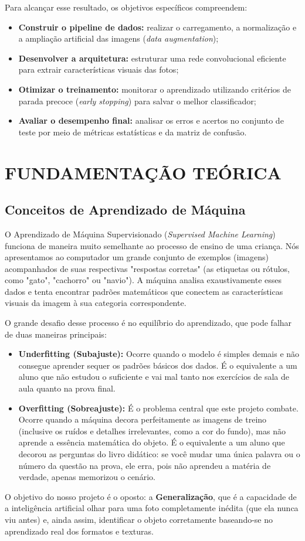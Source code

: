 \documentclass[12pt,a4paper]{article}
\begin{document}
Para alcançar esse resultado, os objetivos específicos compreendem:
\begin{itemize}
    \item \textbf{Construir o pipeline de dados:} realizar o carregamento, a normalização e a ampliação artificial das imagens (\textit{data augmentation});
    \item \textbf{Desenvolver a arquitetura:} estruturar uma rede convolucional eficiente para extrair características visuais das fotos;
    \item \textbf{Otimizar o treinamento:} monitorar o aprendizado utilizando critérios de parada precoce (\textit{early stopping}) para salvar o melhor classificador;
    \item \textbf{Avaliar o desempenho final:} analisar os erros e acertos no conjunto de teste por meio de métricas estatísticas e da matriz de confusão.
\end{itemize}

\newpage
\section{FUNDAMENTAÇÃO TEÓRICA}
\subsection{Conceitos de Aprendizado de Máquina}
O Aprendizado de Máquina Supervisionado (\textit{Supervised Machine Learning}) funciona de maneira muito semelhante ao processo de ensino de uma criança. Nós apresentamos ao computador um grande conjunto de exemplos (imagens) acompanhados de suas respectivas "respostas corretas" (as etiquetas ou rótulos, como "gato", "cachorro" ou "navio"). A máquina analisa exaustivamente esses dados e tenta encontrar padrões matemáticos que conectem as características visuais da imagem à sua categoria correspondente.

O grande desafio desse processo é no equilíbrio do aprendizado, que pode falhar de duas maneiras principais:
\begin{itemize}
    \item \textbf{Underfitting (Subajuste):} Ocorre quando o modelo é simples demais e não consegue aprender sequer os padrões básicos dos dados. É o equivalente a um aluno que não estudou o suficiente e vai mal tanto nos exercícios de sala de aula quanto na prova final.
    \item \textbf{Overfitting (Sobreajuste):} É o problema central que este projeto combate. Ocorre quando a máquina decora perfeitamente as imagens de treino (inclusive os ruídos e detalhes irrelevantes, como a cor do fundo), mas não aprende a essência matemática do objeto. É o equivalente a um aluno que decorou as perguntas do livro didático: se você mudar uma única palavra ou o número da questão na prova, ele erra, pois não aprendeu a matéria de verdade, apenas memorizou o cenário.
\end{itemize}
O objetivo do nosso projeto é o oposto: a \textbf{Generalização}, que é a capacidade de a inteligência artificial olhar para uma foto completamente inédita (que ela nunca viu antes) e, ainda assim, identificar o objeto corretamente baseando-se no aprendizado real dos formatos e texturas.
\end{document}
